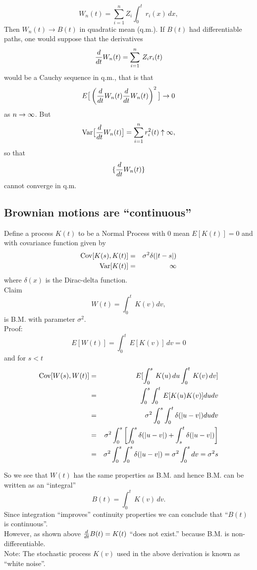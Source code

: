 $$W_n(t) = \sum_{i=1}^n Z_i \int_0^t\, r_i(x) \, dx,$$ Then $W_n(t) \rightarrow B(t)$ in quadratic mean (q.m.). If $B(t)$ had differentiable paths, one would suppose that the derivatives $${d\over dt} W_n(t) = \sum_{i=1}^n\, Z_i r_i(t)$$ would be a Cauchy sequence in q.m., that is that $$E\big[\left({d\over dt}W_n(t) {d\over dt}W_n(t) \right)^2\big] \rightarrow 0$$ as $n\rightarrow\infty$. But $$\hbox{Var}\big[{d\over dt} W_n(t)\big] = \sum_{i=1}^n r_i^2(t) \uparrow \infty,$$ so that $$\{ {d\over dt} W_n(t)\}$$ cannot converge in q.m.

\subsection{Brownian motions are ``continuous''}

Define a process $K(t)$ to be a Normal Process with $0$ mean $E[K(t)] = 0$ and with covariance function given by 
\begin{eqnarray*}
\hbox{Cov}[K(s), K(t)] &=& \sigma^2 \delta(|t-s|)\\
\hbox{Var}[K(t)]           &=& \infty \\
\end{eqnarray*} where $\delta(x)$ is the Dirac-delta function. \\

Claim $$W(t) = \int_0^t\, K(v) dv,$$ is B.M. with parameter $\sigma^2$.\\

Proof: $$E[W(t)] = \int_0^t\, E[K(v)] \, dv = 0$$ and for $s<t$ 
\begin{eqnarray*}
\hbox{Cov}[W(s), W(t)] &=& E[\int_0^s \, K(u)\, du \int_0^t \, K(v)\, dv] \\
&=& \int_0^s \int_0^t\, E[K(u)K(v)] du dv \\
&=& \sigma^2 \int_0^s \int_0^t \delta(|u-v|) du dv \\
&=& \sigma^2 \int_0^s \left[\int_0^s \delta(|u-v|) + \int_s^t \delta(|u - v|) \right]\\
&=& \sigma^2 \int_0^s \int_0^s \delta(|u-v|) = \sigma^2 \int_0^s dv = \sigma^2 s\\
\end{eqnarray*}

So we see that $W(t)$ has the same properties as B.M. and hence B.M. can be written as an ``integral'' $$B(t) = \int_0^t \, K(v)\, dv.$$ Since integration ``improves'' continuity properties we can conclude that  ``$B(t)$ is continuous''.\\

However, as shown above ${d\over dt} B(t) = K(t)$ ``does not exist.'' because B.M. is non-differentiable. \\

Note: The stochastic process $K(v)$ used in the above derivation is known as ``white noise''.